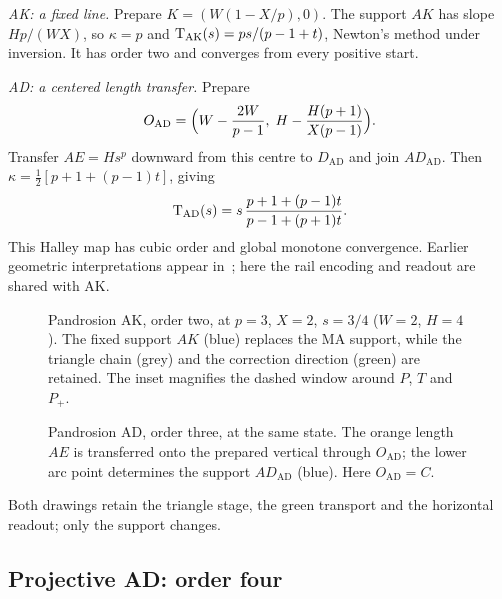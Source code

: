\emph{AK: a fixed line.} Prepare $K=(W(1-X/p),0)$. The support $AK$ has slope $Hp/(WX)$, so
$\kappa=p$ and $\mathrm{T}_{\mathrm{AK}}(s)=ps/(p-1+t)$, Newton's method under inversion. It has order two and
converges from every positive start.

\emph{AD: a centered length transfer.} Prepare
\[ O_{\mathrm{AD}}=\Bigl(W-\frac{2W}{p-1},\;H-\frac{H(p+1)}{X(p-1)}\Bigr). \]
Transfer $AE=Hs^{p}$ downward from this centre to $D_{\mathrm{AD}}$ and join $AD_{\mathrm{AD}}$. Then
$\kappa=\tfrac12[p+1+(p-1)t]$, giving
\begin{equation}\label{eq:AD}
\mathrm{T}_{\mathrm{AD}}(s)=s\,\frac{p+1+(p-1)t}{p-1+(p+1)t}.
\end{equation}
This Halley map has cubic order and global monotone convergence. Earlier geometric interpretations
appear in~\cite{gander,scavo}; here the rail encoding and readout are shared with AK.

\begin{figure}[h]
\centering\figAK
\caption{Pandrosion AK, order two, at $p=3$, $X=2$, $s=3/4$ ($W=2$, $H=4$). The fixed support $AK$
(blue) replaces the MA support, while the triangle chain (grey) and the correction direction (green)
are retained. The inset magnifies the dashed window around $P$, $T$ and $P_+$.}\label{fig:ak}
\end{figure}

\begin{figure}[h]
\centering\figAD
\caption{Pandrosion AD, order three, at the same state. The orange length $AE$ is transferred onto the
prepared vertical through $O_{\mathrm{AD}}$; the lower arc point determines the support
$AD_{\mathrm{AD}}$ (blue). Here $O_{\mathrm{AD}}=C$.}\label{fig:ad}
\end{figure}

Both drawings retain the triangle stage, the green transport and the horizontal readout; only the
support changes.

\subsection{Projective AD: order four}

